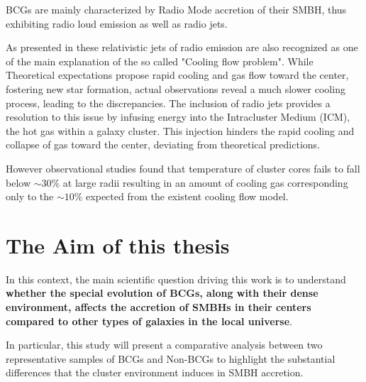  
BCGs are mainly characterized by Radio Mode accretion of their SMBH, thus exhibiting radio loud emission as well as radio jets.

As presented in \cite{2007MNRAS.379..867V} these relativistic jets of radio emission are also recognized as one of the main explanation of the so called "Cooling flow problem". 
While Theoretical expectations propose rapid cooling and gas flow toward the center, fostering new star formation, actual observations reveal a much slower cooling process, leading to the discrepancies.
The inclusion of radio jets provides a resolution to this issue by infusing energy into the Intracluster Medium (ICM), the hot gas within a galaxy cluster. This injection hinders the rapid cooling and collapse of gas toward the center, deviating from theoretical predictions.

However observational studies found that temperature of cluster cores fails to fall below $\sim 30\%$ at large radii resulting in an amount of cooling gas corresponding only to the $\sim 10\%$ expected from the existent cooling flow model. \cite{David_2001} %

\newpage
\section{The Aim of this thesis} %
In this context, the main scientific question driving this work is to understand \textbf{whether the special evolution of BCGs, along with their dense environment, affects the accretion of SMBHs in their centers compared to other types of galaxies in the local universe}.

In particular, this study will present a comparative analysis between two representative samples of BCGs and Non-BCGs to highlight the substantial differences that the cluster environment induces in SMBH accretion.


